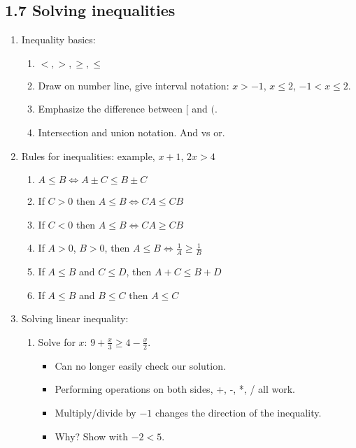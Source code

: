 \documentclass{article}
\begin{document}
\subsection{1.7 Solving inequalities}

\begin{enumerate}
\item Inequality basics:
\begin{enumerate}
\item $<, >, \geq, \leq$
\item Draw on number line, give interval notation: $x>-1$, $x\leq 2$, $-1<x\leq 2$. 
\item Emphasize the difference between $[$ and $($. 
\item Intersection and union notation. And vs or. 
\end{enumerate}

\item Rules for inequalities: example, $x+1$, $2x >4$
\begin{enumerate}
\item $A\leq B\Leftrightarrow A\pm C \leq B\pm C$ 
\item If $C>0$ then $A\leq B \Leftrightarrow CA\leq CB$
\item If $C<0$ then $A\leq B \Leftrightarrow CA\geq CB$
\item If $A>0$, $B>0$, then $A\leq B \Leftrightarrow \frac{1}{A}\geq\frac{1}{B}$
\item If $A\leq B$ and $C\leq D$, then $A+C\leq B+D$
\item If $A\leq B$ and $B\leq C$ then $A\leq C$
\end{enumerate}

\item Solving linear inequality: 
\begin{enumerate}
\item Solve for $x$: $9+\frac{x}{3} \geq 4-\frac{x}{2}$. 
\begin{itemize}
\item Can no longer easily check our solution. 
\item Performing operations on both sides, +, -, *, / all work.
\item Multiply/divide by $-1$ changes the direction of the inequality. 
\item Why? Show with $-2<5$.  
\end{itemize}


\end{enumerate}
\end{enumerate}
\end{document}
